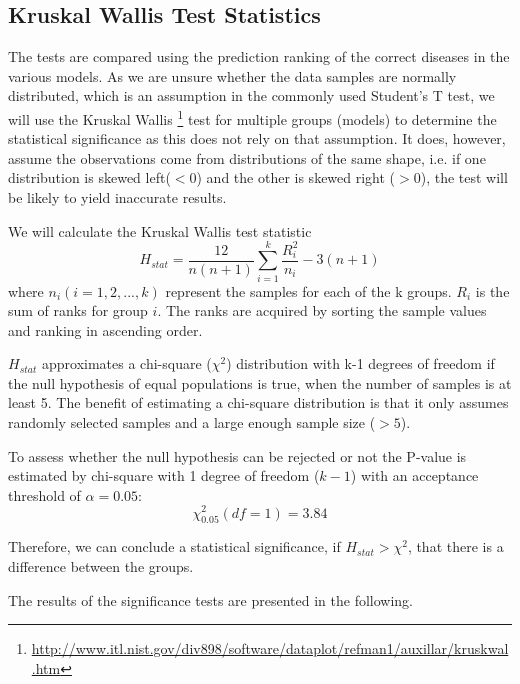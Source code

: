 \documentclass[10pt,letterpaper,final]{article}
\begin{document}
\subsection{Kruskal Wallis Test Statistics}
The tests are compared using the prediction ranking of the correct
diseases in the various models. As we are unsure whether the data
samples are normally distributed, which is an assumption in the commonly
used Student's T test, we will use the Kruskal Wallis
\footnote{\url{http://www.itl.nist.gov/div898/software/dataplot/refman1/auxillar/kruskwal.htm}}
test for multiple groups (models) to determine the statistical
significance as this does not rely on that assumption. It does, however,
assume the observations come from distributions of the same shape, i.e.
if one distribution is skewed left($<0$) and the other is skewed right
($>0$), the test will be likely to yield inaccurate results.

We will calculate the Kruskal Wallis test statistic
\[
H_{stat} = \frac{12}{n(n+1)}\sum\limits_{i = 1}^{k} \frac{R^{2}_{i}}{n_{i}} - 3(n+1)
\]
where $n_{i} (i = 1, 2, ..., k)$ represent the samples for each of
the k groups. $R_{i}$ is the sum of ranks for group $i$. The ranks are
acquired by sorting the sample values and ranking in ascending order.

$H_{stat}$ approximates a chi-square ($\chi^2$) distribution with k-1
degrees of freedom if the null hypothesis of equal populations is true,
when the number of samples is at least 5. The benefit of estimating a
chi-square distribution is that it only assumes randomly selected
samples and a large enough sample size ($>5$).

To assess whether the null hypothesis can be rejected or not the P-value
is estimated by chi-square with 1 degree of freedom ($k-1$) with an
acceptance threshold of $\alpha = 0.05$:
\[
\chi^2_{0.05}(df=1) = 3.84
\]



Therefore, we can conclude a statistical significance, if $H_{stat} >
\chi^2$, that there is a difference between the groups.

The results of the significance tests are presented in the following.
\end{document}
